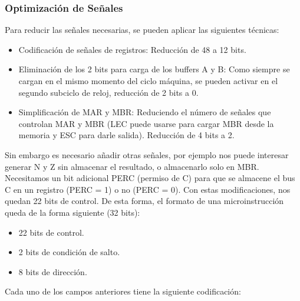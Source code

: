\subsubsection*{Optimización de Señales}
Para reducir las señales necesarias, se pueden aplicar las siguientes técnicas:
\begin{itemize}
    \item Codificación de señales de registros: Reducción de 48 a 12 bits.
    \item Eliminación de los 2 bits para carga de los buffers A y B: Como siempre se cargan en el mismo momento del ciclo máquina, se pueden activar en el segundo subciclo de reloj, reducción de 2 bits a 0.
    \item Simplificación de MAR y MBR: Reduciendo el número de señales que controlan MAR y MBR (LEC puede usarse para cargar MBR desde la memoria y ESC para darle salida). Reducción de 4 bits a 2.
\end{itemize}
Sin embargo es necesario añadir otras señales, por ejemplo nos puede interesar generar N y Z sin almacenar el resultado, o almacenarlo solo en MBR. Necesitamos un bit adicional PERC (permiso de C) para que se almacene el bus C en un registro (PERC = 1) o no (PERC = 0).
Con estas modificaciones, nos quedan 22 bits de control. De esta forma, el formato de una microinstrucción queda de la forma siguiente (32 bits):
\begin{itemize}
    \item 22 bits de control.
    \item 2 bits de condición de salto.
    \item 8 bits de dirección.
\end{itemize}

\begin{center}
    
\end{center}
Cada uno de los campos anteriores tiene la siguiente codificación:

